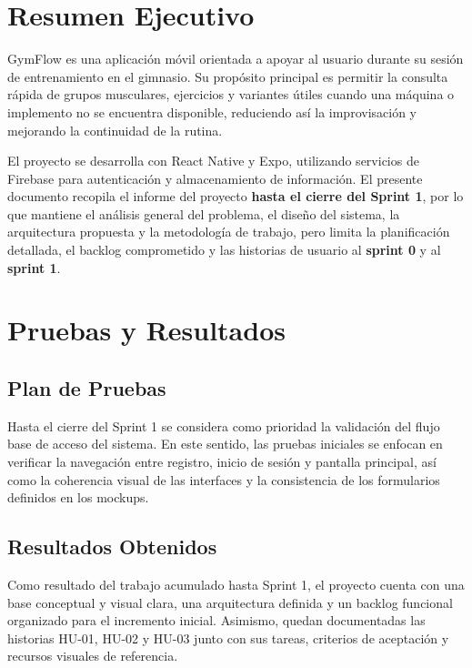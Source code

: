 \documentclass[12pt,letterpaper]{article}
\begin{document}


\clearpage
\tableofcontents

\clearpage
\section{Resumen Ejecutivo}

GymFlow es una aplicación móvil orientada a apoyar al usuario durante su sesión de entrenamiento en el gimnasio. Su propósito principal es permitir la consulta rápida de grupos musculares, ejercicios y variantes útiles cuando una máquina o implemento no se encuentra disponible, reduciendo así la improvisación y mejorando la continuidad de la rutina.

El proyecto se desarrolla con React Native y Expo, utilizando servicios de Firebase para autenticación y almacenamiento de información. El presente documento recopila el informe del proyecto \textbf{hasta el cierre del Sprint 1}, por lo que mantiene el análisis general del problema, el diseño del sistema, la arquitectura propuesta y la metodología de trabajo, pero limita la planificación detallada, el backlog comprometido y las historias de usuario al \textbf{sprint 0} y al \textbf{sprint 1}.






\section{Pruebas y Resultados}

\subsection{Plan de Pruebas}

Hasta el cierre del Sprint 1 se considera como prioridad la validación del flujo base de acceso del sistema. En este sentido, las pruebas iniciales se enfocan en verificar la navegación entre registro, inicio de sesión y pantalla principal, así como la coherencia visual de las interfaces y la consistencia de los formularios definidos en los mockups.

\subsection{Resultados Obtenidos}

Como resultado del trabajo acumulado hasta Sprint 1, el proyecto cuenta con una base conceptual y visual clara, una arquitectura definida y un backlog funcional organizado para el incremento inicial. Asimismo, quedan documentadas las historias HU-01, HU-02 y HU-03 junto con sus tareas, criterios de aceptación y recursos visuales de referencia.
\end{document}

